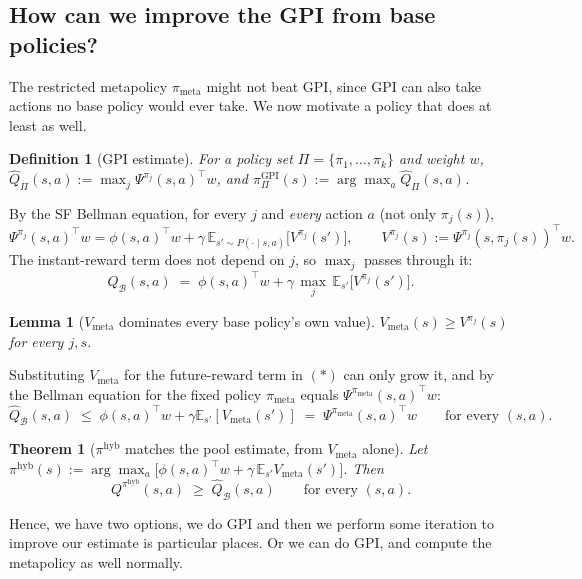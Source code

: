 \documentclass[11pt]{article}
\newtheorem{theorem}{Theorem}
\newtheorem{lemma}{Lemma}
\newtheorem{definition}{Definition}
\begin{document}
\subsection{How can we improve the GPI from base policies?}

The restricted metapolicy $\pi_{\mathrm{meta}}$ might not beat GPI, since GPI can also take actions no base policy
would ever take. We now motivate a policy that does at least as well. 

\begin{definition}[GPI estimate]
For a policy set $\Pi=\{\pi_1,\dots,\pi_k\}$ and weight $w$, $\widehat Q_\Pi(s,a) := \max_{j} \Psi^{\pi_j}(s,a)^\top w$,
and $\pi^{\mathrm{GPI}}_\Pi(s) := \arg\max_a \widehat Q_\Pi(s,a)$.
\end{definition}

By the SF Bellman equation, for every $j$ and \emph{every} action $a$ (not only $\pi_j(s)$),
\[
\Psi^{\pi_j}(s,a)^\top w = \phi(s,a)^\top w + \gamma\,\mathbb E_{s'\sim P(\cdot\mid s,a)}\big[V^{\pi_j}(s')\big],
\qquad V^{\pi_j}(s):=\Psi^{\pi_j}(s,\pi_j(s))^\top w.
\]
The instant-reward term does not depend on $j$, so $\max_j$ passes through it:
\[
\widehat Q_{\mathcal B}(s,a) \;=\; \phi(s,a)^\top w + \gamma\,\max_j\,\mathbb E_{s'}\big[V^{\pi_j}(s')\big]. \tag{$\ast$}
\]

\begin{lemma}[$V_{\mathrm{meta}}$ dominates every base policy's own value]\label{lem:meta-dominates}
$V_{\mathrm{meta}}(s)\ge V^{\pi_j}(s)$ for every $j,s$.
\end{lemma}

Substituting $V_{\mathrm{meta}}$ for the future-reward term in $(\ast)$ can only grow it, and by the Bellman equation for the fixed policy $\pi_{\mathrm{meta}}$ equals $\Psi^{\pi_{\mathrm{meta}}}(s,a)^\top w$:
\[
\widehat Q_{\mathcal B}(s,a) \;\le\; \phi(s,a)^\top w+\gamma\mathbb E_{s'}[V_{\mathrm{meta}}(s')]
\;=\; \Psi^{\pi_{\mathrm{meta}}}(s,a)^\top w \qquad\text{for every }(s,a). \tag{$\ast\ast$}
\]

\begin{theorem}[$\pi^{\mathrm{hyb}}$ matches the pool estimate, from $V_{\mathrm{meta}}$ alone]\label{thm:envelope}
Let $\pi^{\mathrm{hyb}}(s):=\arg\max_a\big[\phi(s,a)^\top w+\gamma\,\mathbb E_{s'}V_{\mathrm{meta}}(s')\big]$. Then
\[
Q^{\pi^{\mathrm{hyb}}}(s,a) \;\ge\; \widehat Q_{\mathcal B}(s,a) \qquad\text{for every }(s,a).
\]
\end{theorem}

Hence, we have two options, we do GPI and then we perform some iteration to improve our estimate is particular places. Or we can do GPI, and compute the metapolicy as well normally. 
\\
\end{document}
